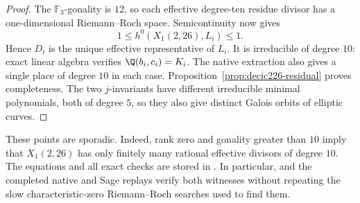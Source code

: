 \begin{proof}
The $\mathbb F_3$-gonality is $12$, so each effective degree-ten
residue divisor has a one-dimensional Riemann--Roch space.
Semicontinuity now gives
\[
 1\leq h^0(X_1(2,26),L_i)\leq1.
\]
Hence $D_i$ is the unique effective representative of $L_i$.
It is irreducible of degree $10$: exact linear algebra verifies
$\Q(b_i,c_i)=K_i$. The native extraction also gives a single place
of degree $10$ in each case. Proposition~\ref{prop:decic226-residual} proves completeness.
The two $j$-invariants have different irreducible minimal polynomials,
both of degree $5$, so they also give distinct Galois orbits of elliptic
curves.
\end{proof}

These points are sporadic. Indeed, rank zero and gonality greater
than $10$ imply that $X_1(2,26)$ has only finitely many rational
effective divisors of degree $10$. The equations and all exact checks
are stored in . In particular,
 and the completed native and Sage
replays verify both witnesses without repeating the slow
characteristic-zero Riemann--Roch searches used to find them.

